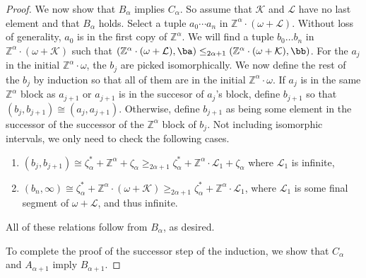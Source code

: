 \documentclass{amsart}
\newcommand{\Z}{\mathbb{Z}}
\newcommand{\K}{\mathcal{K}}
\renewcommand{\L}{\mathcal{L}}
\begin{document}
\begin{proof}
We now show that $B_\alpha$ implies $C_\alpha$. So assume that $\K$ and $\L$ have
no last element and that $B_\alpha$ holds. 
Select a tuple $a_0\cdots  a_n$ in $\Z^\alpha\cdot(\omega+\L)$.
Without loss of generality, $a_0$ is in the first copy of $\Z^\alpha$. We will
find a tuple $b_0\dots b_n$ in $\Z^\alpha\cdot(\omega+\K)$ such that
$(\Z^\alpha\cdot (\omega+\L),\ba)\leq_{2\alpha+1}
(\Z^\alpha\cdot(\omega+\K),\bb)$. For the $a_j$ in the initial $\Z^\alpha\cdot\omega$, the $b_j$ are picked isomorphically. 
We now define the rest of the $b_j$ by induction so that all of them are in the initial $\Z^\alpha\cdot\omega$.
If $a_j$ is in the same $\Z^\alpha$ block as $a_{j+1}$ or $a_{j+1}$ is in the
succesor of $a_j$'s block, define $b_{j+1}$ so that
$(b_j,b_{j+1})\cong (a_j,a_{j+1})$.
Otherwise, define $b_{j+1}$ as being some element in the successor of the
successor of the $\Z^\alpha$ block of $b_j$. 
Not including isomorphic intervals, we only need to check the following cases. 
\begin{enumerate}
    \item $(b_j,b_{j+1})\cong\zeta^*_\alpha +\Z^\alpha+\zeta_\alpha \geq_{2\alpha+1} \zeta^*_\alpha
    +\Z^\alpha\cdot \L_1+\zeta_\alpha$ where $\L_1$ is infinite, 
\item $(b_n,\infty)\cong\zeta^*_\alpha +\Z^\alpha\cdot (\omega+\K) \geq_{2\alpha+1}
    \zeta^*_\alpha +\Z^\alpha\cdot \L_1$, where $\L_1$ is some final segment of
    $\omega+\L$, and thus infinite.
\end{enumerate} 
All of these relations follow from $B_\alpha$, as desired.

To complete the proof of the successor step of the induction, we show that
$C_\alpha$ and $A_{\alpha+1}$ imply $B_{\alpha+1}$.


\end{proof}
\end{document}
